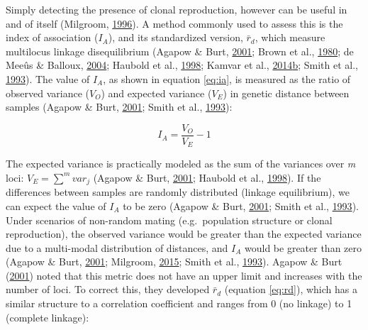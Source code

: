 \documentclass[double,11pt]{beavtex}
\begin{document}
  Simply detecting the presence of clonal reproduction, however can be
  useful in and of itself (Milgroom,
  \protect\hyperlink{ref-milgroom1996recombination}{1996}). A method
  commonly used to assess this is the index of association (\(I_A\)), and
  its standardized version, \(\bar{r}_d\), which measure multilocus
  linkage disequilibrium (Agapow \& Burt,
  \protect\hyperlink{ref-Agapow_2001}{2001}; Brown et al.,
  \protect\hyperlink{ref-brown1980multilocus}{1980}; de Meeûs \& Balloux,
  \protect\hyperlink{ref-de2004clonal}{2004}; Haubold et al.,
  \protect\hyperlink{ref-haubold1998detecting}{1998}; Kamvar et al.,
  \protect\hyperlink{ref-kamvar2014poppr}{2014}\protect\hyperlink{ref-kamvar2014poppr}{b};
  Smith et al., \protect\hyperlink{ref-smith1993how}{1993}). The value of
  \(I_A\), as shown in equation \eqref{eq:ia}, is measured as the ratio of
  observed variance (\(V_O\)) and expected variance (\(V_E\)) in genetic
  distance between samples (Agapow \& Burt,
  \protect\hyperlink{ref-Agapow_2001}{2001}; Smith et al.,
  \protect\hyperlink{ref-smith1993how}{1993}):
  
  \begin{equation}
  I_A = \frac{V_O}{V_E} - 1 \label{eq:ia}
  \end{equation}
  
  The expected variance is practically modeled as the sum of the variances
  over \emph{m} loci: \(V_E = \sum^m{var_j}\) (Agapow \& Burt,
  \protect\hyperlink{ref-Agapow_2001}{2001}; Haubold et al.,
  \protect\hyperlink{ref-haubold1998detecting}{1998}). If the differences
  between samples are randomly distributed (linkage equilibrium), we can
  expect the value of \(I_A\) to be zero (Agapow \& Burt,
  \protect\hyperlink{ref-Agapow_2001}{2001}; Smith et al.,
  \protect\hyperlink{ref-smith1993how}{1993}). Under scenarios of
  non-random mating (e.g.~population structure or clonal reproduction),
  the observed variance would be greater than the expected variance due to
  a multi-modal distribution of distances, and \(I_A\) would be greater
  than zero (Agapow \& Burt, \protect\hyperlink{ref-Agapow_2001}{2001};
  Milgroom, \protect\hyperlink{ref-milgroom2015population}{2015}; Smith et
  al., \protect\hyperlink{ref-smith1993how}{1993}). Agapow \& Burt
  (\protect\hyperlink{ref-Agapow_2001}{2001}) noted that this metric does
  not have an upper limit and increases with the number of loci. To
  correct this, they developed \(\bar{r}_d\) (equation \eqref{eq:rd}), which
  has a similar structure to a correlation coefficient and ranges from 0
  (no linkage) to 1 (complete linkage):
  
\end{document}
